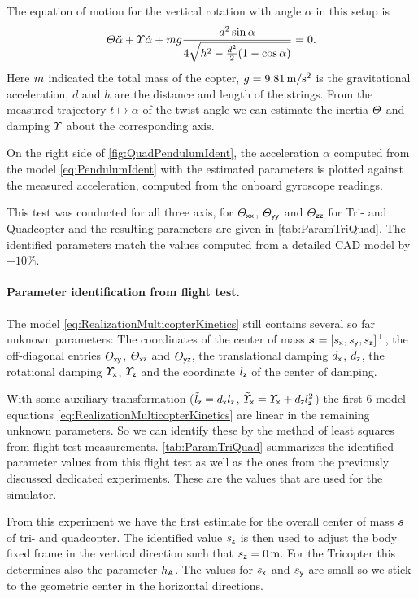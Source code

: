 The equation of motion for the vertical rotation with angle $\alpha$ in this setup is
\begin{align}\label{eq:PendulumIdent}
 \varTheta \ddot{\alpha} + \varUpsilon \dot{\alpha} + m g \frac{d^2 \sin\alpha}{4\sqrt{h^2 - \tfrac{d^2}{2}(1-\cos\alpha)}} = 0.
\end{align}
Here $m$ indicated the total mass of the copter, $g = 9.81\,\text{m} / \text{s}^2$ is the gravitational acceleration, $d$ and $h$ are the distance and length of the strings.
From the measured trajectory $t\mapsto\alpha$ of the twist angle we can estimate the inertia $\varTheta$ and damping $\varUpsilon$ about the corresponding axis.

On the right side of \autoref{fig:QuadPendulumIdent}, the acceleration $\ddot{\alpha}$ computed from the model \eqref{eq:PendulumIdent} with the estimated parameters is plotted against the measured acceleration, computed from the onboard gyroscope readings.

This test was conducted for all three axis, \ie for $\varTheta_{\mathsf{x}\mathsf{x}}$, $\varTheta_{\mathsf{y}\mathsf{y}}$ and $\varTheta_{\mathsf{z}\mathsf{z}}$ for Tri- and Quadcopter and the resulting parameters are given in \autoref{tab:ParamTriQuad}.
The identified parameters match the values computed from a detailed CAD model by $\pm 10\%$.

\paragraph*{Parameter identification from flight test.}
The model \eqref{eq:RealizationMulticopterKinetics} still contains several so far unknown parameters:
The coordinates of the center of mass $\bodyCOM{}{}{} = [\sx, \sy, \sz]^\top$, the off-diagonal entries $\varTheta_{\mathsf{x}\mathsf{y}}$, $\varTheta_{\mathsf{x}\mathsf{z}}$ and $\varTheta_{\mathsf{y}\mathsf{z}}$, the translational damping $d_{\mathsf{x}}$, $d_{\mathsf{z}}$, the rotational damping $\varUpsilon_{\mathsf{x}}$, $\varUpsilon_{\mathsf{z}}$ and the coordinate $l_{\mathsf{z}}$ of the center of damping.

With some auxiliary transformation ($\tilde{l}_{\mathsf{z}} = d_{\mathsf{x}}l_{\mathsf{z}}$, $\tilde{\varUpsilon}_{\mathsf{x}} = \varUpsilon_{\mathsf{x}} + d_{\mathsf{z}}l_{\mathsf{z}}^2$) the first 6 model equations \eqref{eq:RealizationMulticopterKinetics} are linear in the remaining unknown parameters.
So we can identify these by the method of least squares from flight test measurements.
\autoref{tab:ParamTriQuad} summarizes the identified parameter values from this flight test as well as the ones from the previously discussed dedicated experiments.
These are the values that are used for the simulator.

From this experiment we have the first estimate for the overall center of mass $\bodyCOM{}{}{}$ of tri- and quadcopter.
The identified value $s_{\mathsf{z}}$ is then used to adjust the body fixed frame in the vertical direction such that $s_{\mathsf{z}}=0\,\text{m}$.
For the Tricopter this determines also the parameter $h_{\mathsf{A}}$.
The values for $s_{\mathsf{x}}$ and $s_{\mathsf{y}}$ are small so we stick to the geometric center in the horizontal directions.


